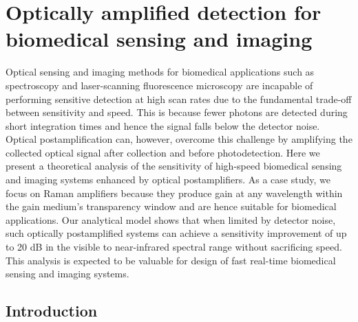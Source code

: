 \chapter{Optically amplified detection for biomedical sensing and imaging}
\label{chp:JOSAA2013_Chapter}

Optical sensing and imaging methods for biomedical applications such as spectroscopy and laser-scanning fluorescence microscopy are incapable of performing sensitive detection at high scan rates due to the fundamental trade-off between sensitivity and speed. This is because fewer photons are detected during short integration times and hence the signal falls below the detector noise. Optical postamplification can, however, overcome this challenge by amplifying the collected optical signal after collection and before photodetection. Here we present a theoretical analysis of the sensitivity of high-speed biomedical sensing and imaging systems enhanced by optical postamplifiers. As a case study, we focus on Raman amplifiers because they produce gain at any wavelength within the gain medium's transparency window and are hence suitable for biomedical applications. Our analytical model shows that when limited by detector noise, such optically postamplified systems can achieve a sensitivity improvement of up to 20 dB in the visible to near-infrared spectral range without sacrificing speed. This analysis is expected to be valuable for design of fast real-time biomedical sensing and imaging systems.

\section{Introduction} \label{sec:JOSAA2013_Section1}

